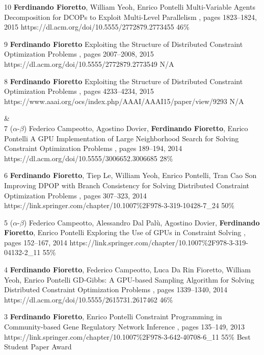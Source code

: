 \begin{pubs}
	\confentry
		{10} %
		{{\bf Ferdinando Fioretto}, William Yeoh, Enrico Pontelli}
		{Multi-Variable Agents Decomposition for DCOPs to Exploit Multi-Level Parallelism}
		{\procAAMAS, pages 1823--1824, 2015}
		{https://dl.acm.org/doi/10.5555/2772879.2773455}
		{46\%}

	\confentry
		{9} %
		{{\bf Ferdinando Fioretto}}
		{Exploiting the Structure of Distributed Constraint Optimization Problems} 
		{\procAAMAS, pages 2007--2008, 2015}
		{https://dl.acm.org/doi/10.5555/2772879.2773549}
		{N/A}

	\confentry
		{8} %
		{{\bf Ferdinando Fioretto}} 
		{Exploiting the Structure of Distributed Constraint Optimization Problems}
		{\procAAAI,  pages 4233--4234, 2015}
		{https://www.aaai.org/ocs/index.php/AAAI/AAAI15/paper/view/9293}
		{N/A}

{}&\nemph{\rule{0.5\linewidth}{0.5pt}}\\[1em]
	\confentry 
		{7} %
		{($\alpha$-$\beta$) 
		Federico Campeotto, Agostino Dovier, {\bf Ferdinando Fioretto}, Enrico Pontelli}
		{A GPU Implementation of Large Neighborhood Search for Solving Constraint Optimization Problems} 
		{\procECAI, pages 189--194, 2014}
		{https://dl.acm.org/doi/10.5555/3006652.3006685}
		{28\%}

	\confentry
		{6} %
		{{\bf Ferdinando Fioretto}, Tiep Le, William Yeoh, Enrico Pontelli, Tran Cao Son}
		{Improving DPOP with Branch Consistency for Solving Distributed Constraint Optimization Problems}
		{\procCP, pages 307--323, 2014}
		{https://link.springer.com/chapter/10.1007\%2F978-3-319-10428-7\_24}
		{50\%}
		
	\confentry
		{5} %
		{($\alpha$-$\beta$) 
		Federico Campeotto, Alessandro Dal Pal\`{u}, Agostino Dovier, {\bf Ferdinando Fioretto}, Enrico Pontelli}
		{Exploring the Use of GPUs in Constraint Solving}
		{\procPADL, pages 152--167, 2014}
		{https://link.springer.com/chapter/10.1007\%2F978-3-319-04132-2\_11}
		{55\%}

	\confentry 
		{4} %
		{{\bf Ferdinando Fioretto}, Federico Campeotto, Luca Da Rin Fioretto, William Yeoh, Enrico Pontelli} 
		{GD-Gibbs: A GPU-based Sampling Algorithm for Solving Distributed Constraint Optimization Problems} %
		{\procAAMAS, pages 1339--1340, 2014}
		{https://dl.acm.org/doi/10.5555/2615731.2617462}
		{46\%}
	
	\confentryAwd
		{3} %
		{{\bf Ferdinando Fioretto}, Enrico Pontelli} 
		{Constraint Programming in Community-based Gene Regulatory Network Inference} 
		{\procCMSB, pages 135--149, 2013}
		{https://link.springer.com/chapter/10.1007\%2F978-3-642-40708-6\_11}
		{55\%}
		{Best Student Paper Award}{}


\end{pubs}
